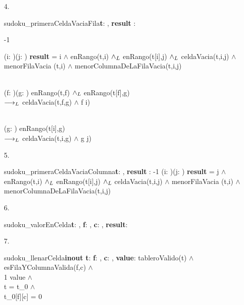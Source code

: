 \documentclass[a4paper]{article}
\begin{document}
4. \begin{proc}{sudoku\_primeraCeldaVaciaFila}{\textbf{\In t}: \matriz{\ent}, \textbf{\Out result} : \ent  }{}{}
    \post
		{
			{-1}
			{
				(\exists i: \ent)(\exists j: \ent) \textbf{result} = i $\land$ enRango(t,i) $\land _L$ enRango(t[i],j)        $\land _L$ celdaVacia(t,i,j) $\land$ menorFilaVacia (t,i) $\land$ menorColumnaDeLaFilaVacia(t,i,j)
				
				{\\
					(\forall f: \ent)(\forall g: \ent) enRango(t,f) $\land _L$ enRango(t[f],g)\\
					$\longrightarrow _L$ celdaVacia(t,f,g) $\land$ f \geq i)
				}
		
			{\\
				(\forall g: \ent) enRango(t[i],g)\\
				$\longrightarrow _L$ celdaVacia(t,i,g) $\land$ g \geq j)
			}
			}
		}
	\end{proc}

5. \begin{proc}{sudoku\_primeraCeldaVaciaColumna}{\textbf{\In t}: \matriz{\ent}, \textbf{\Out result} : \ent }{}{}
    \post
		{
			{-1}
			{
				(\exists i: \ent)(\exists j: \ent) \textbf{result} = j $\land$ enRango(t,i) $\land _L$ enRango(t[i],j)        $\land _L$ celdaVacia(t,i,j) $\land$ menorFilaVacia (t,i) $\land$ menorColumnaDeLaFilaVacia(t,i,j)
			}
		}
	\end{proc}

6. \begin{proc}{sudoku\_valorEnCelda}{\textbf{\In t}: \matriz{\ent}, \textbf{\In f}: \ent, \textbf{\In c}: \ent, \textbf{\Out result}: \ent}{}{}
	\end{proc}

7. \begin{proc}{sudoku\_llenarCelda}{\textbf{inout t}: \matriz{\ent} \textbf{\In f}: \ent, \textbf{\In c}: \ent, \textbf{\In value}: \ent}{}{}
    \pre
		{
			tableroValido(t) $\land$\\
			esFilaYColumnaValida(f,c) $\land$\\
			1 \leq value  $\land$\\
			t = t_{0} $\land$\\
			t_{0}[f][c] = 0
		}
	\end{proc}
\end{document}
